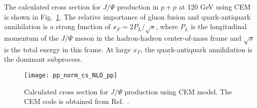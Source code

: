 \documentclass[../main.tex]{subfiles}
\begin{document}
The calculated cross section for $J/\Psi$ production in $p+p$ at 120 GeV using 
CEM is shown in Fig.\ \ref{fig:cem_cs}. The relative importance of gluon fusion 
and quark-antiquark annihilation is a strong function of $x_F=2P_L/\sqrt{s}$, 
where $P_L$ is the longitudinal momentum of the $J/\Psi$ meson in the 
hadron-hadron center-of-mass frame and $\sqrt{s}$ is the total energy in this 
frame. At large $x_F$, the quark-antiquark annihilation is the dominant subprocess.  
\begin{figure}[h!]
    \centering
    \texttt{[image: pp\_norm\_cs\_NLO\_pp]}
    \caption{Calculated cross section for $J/\Psi$ production using CEM model. 
		The CEM code is obtained from Ref.\ \cite{mangano1993}.}
    \label{fig:cem_cs}
\end{figure}
\end{document}
